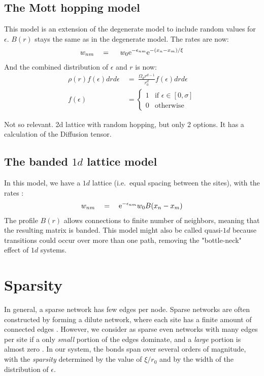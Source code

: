 \subsection{The Mott hopping model}\label{sec:mott_hopping}

This model is an extension of the degenerate model to include
random values for $\epsilon$. $B(r)$ stays the same as in the degenerate model.
The rates are now:
%
\begin{align}\label{eq:mott_hopping_rates}
w_{nm} \quad = \quad \ w_0 \mbox{e}^{-\epsilon_{nm}}\mbox{e}^{-(x_n-x_m)/\xi}
\end{align}
%
And the combined distribution of $\epsilon$ and $r$ is now:
%
\begin{align}\label{eq:mott_distribution}
\rho(r)f(\epsilon)drd\epsilon \ &=\ \frac{\Omega_d r^{d-1}}{r_0^d} f(\epsilon) dr d\epsilon \\
f(\epsilon)\ &= 
  \begin{cases} 
    1 &\textrm{if   } \epsilon \in [0,\sigma] \\
    0 &\textrm{otherwise}
  \end{cases}
\end{align}
%

Not so relevant. 2d lattice with random hopping, but only 2 options. It has a calculation of the Diffusion tensor.
\subsection{The banded $1d$ lattice model}

In this model, we have a $1d$ lattice (i.e.\ equal spacing between the sites), 
with the rates :
%
\begin{align}
w_{nm} \quad = \quad \mbox{e}^{-\epsilon_{nm}}w_0 B(x_n-x_m)
\end{align}
%
The profile $B(r)$ allows connections to finite number of neighbors,
meaning that the resulting matrix is banded. This model might also
be called quasi-$1d$ because transitions could occur over more
than one path, removing the "bottle-neck" effect of $1d$ systems.


\section{Sparsity}\label{sec:sparsity}

In general, a sparse network has few edges per node. Sparse networks 
are often constructed by forming a dilute network, where each site
has a finite amount of connected edges 
\cite{rodgers_density_1988,biroli_single_1999,fortin_asymptotic_2005,metz_localization_2010}.
However, we consider as sparse even networks with many edges per site
if a only \emph{small} portion of the edges dominate, and a \emph{large}
portion is almost zero \cite{cohen_energy_2012,stotland_semilinear_2009}. In our system, the bonds span
over several orders of magnitude, with the \emph{sparsity} 
determined by the value of $\xi/r_0$ and by the width of the distribution
of $\epsilon$.

